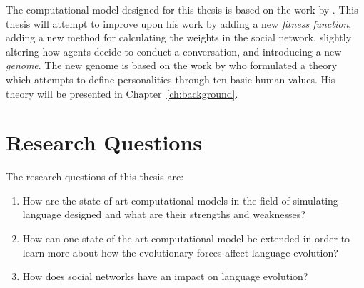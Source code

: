 The computational model designed for this thesis is based on the work by \citeauthor{lekvam2014co}. This thesis will attempt to improve upon his work by adding a new \textit{fitness function}, adding a new method for calculating the weights in the social network, slightly altering how agents decide to conduct a conversation, and introducing a new \textit{genome}. The new genome is based on the work by \citeauthor{schwartz1992unniversals} who formulated a theory which attempts to define personalities through ten basic human values. His theory will be presented in Chapter~\ref{ch:background}.


    \section{Research Questions}
    The research questions of this thesis are:
    
    \begin{centering}
        \begin{enumerate}
            \item How are the state-of-art computational models in the field of simulating language designed and what are their strengths and weaknesses?
            \item How can one state-of-the-art computational model be extended in order to learn more about how the evolutionary forces affect language evolution?
            \item How does social networks have an impact on language evolution? 
        \end{enumerate}
    \end{centering}

